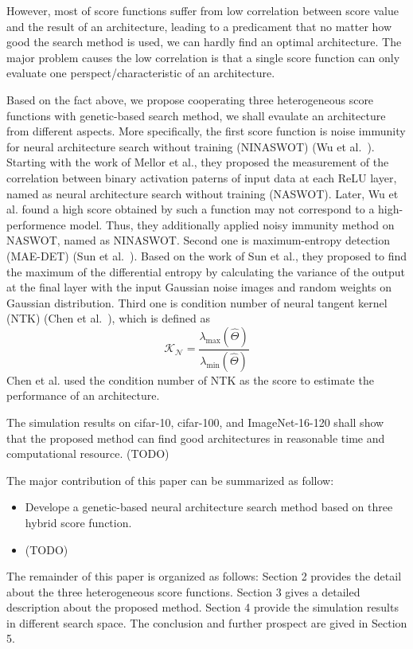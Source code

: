 \documentclass[conference]{IEEEtran}
\begin{document}
    However, most of score functions suffer from low correlation between 
    score value and the result of an architecture, leading to a predicament 
    that no matter how good the search method is used, we can hardly find 
    an optimal architecture. 
    The major problem causes the low correlation is that a single score 
    function can only evaluate one perspect/characteristic of an architecture.
    
    Based on the fact above, we propose cooperating three heterogeneous score 
    functions with genetic-based search method, we shall evaulate an architecture 
    from different aspects. More specifically, the first score function is 
    noise immunity for neural architecture search without training (NINASWOT) 
    (Wu et al.\ \cite{10.1145/3491396.3506510}). Starting with the work of Mellor 
    et al., they proposed the measurement of the correlation between binary 
    activation paterns of input data at each ReLU layer, named as neural architecture 
    search without training (NASWOT). Later, Wu et al. found a high score obtained 
    by such a function may not correspond to a high-performence model. Thus, 
    they additionally applied noisy immunity method on NASWOT, named as NINASWOT. 
    Second one is maximum-entropy detection (MAE-DET) (Sun et al.\ \cite{https://doi.org/10.48550/arxiv.2111.13336}). 
    Based on the work of Sun et al., they proposed to find the maximum of 
    the differential entropy by calculating the variance of the output at 
    the final layer with the input Gaussian noise images and random weights on 
    Gaussian distribution. Third one is condition number of neural tangent kernel 
    (NTK) (Chen et al.\ \cite{https://doi.org/10.48550/arxiv.2102.11535}), which is 
    defined as 
    \begin{equation}
        \mathcal{K_N}=\frac{\lambda_{\textrm{max}}(\hat\Theta)}{\lambda_{\textrm{min}}(\hat\Theta)}
    \end{equation}
    Chen et al. used the condition number of NTK as the score to estimate the performance of an architecture.

    The simulation results on cifar-10, cifar-100, and ImageNet-16-120 
    shall show that the proposed method can find good architectures in 
    reasonable time and computational resource. (TODO)

    The major contribution of this paper can be summarized as follow:
    \begin{itemize}
        \item Develope a genetic-based neural architecture search method based on three hybrid score function.
        \item (TODO)
    \end{itemize}

    The remainder of this paper is organized as follows: Section 2 provides the 
    detail about the three heterogeneous score functions. Section 3 gives a detailed 
    description about the proposed method. Section 4 provide the simulation results 
    in different search space. The conclusion and further prospect are gived in Section 5.

    
    
\end{document}
